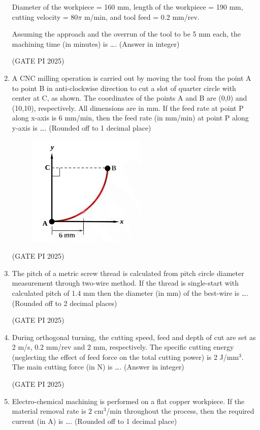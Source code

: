\documentclass[journal,12pt,onecolumn]{IEEEtran}
\theoremstyle{remark}
\begin{document}
\begin{enumerate}
Diameter of the workpiece = 160 mm, length of the workpiece = 190 mm, cutting velocity = $80\pi$ m/min, and tool feed = 0.2 mm/rev.

Assuming the approach and the overrun of the tool to be 5 mm each, the machining time (in minutes) is \dots . (Answer in integer)

\hfill (GATE PI 2025)

\item A CNC milling operation is carried out by moving the tool from the point A to point B in anti-clockwise direction to cut a slot of quarter circle with center at C, as shown. The coordinates of the points A and B are (0,0) and (10,10), respectively. All dimensions are in mm. If the feed rate at point P along x-axis is 6 mm/min, then the feed rate (in mm/min) at point P along y-axis is \dots . (Rounded off to 1 decimal place)

\begin{figure}[H]
\centering
\includegraphics[width=0.5\columnwidth]{fig12.png}
\caption{}
\end{figure}
\hfill (GATE PI 2025)

\item The pitch of a metric screw thread is calculated from pitch circle diameter measurement through two-wire method. If the thread is single-start with calculated pitch of 1.4 mm then the diameter (in mm) of the best-wire is \dots . (Rounded off to 2 decimal places)

\hfill (GATE PI 2025)

\item During orthogonal turning, the cutting speed, feed and depth of cut are set as 2 m/s, 0.2 mm/rev and 2 mm, respectively. The specific cutting energy (neglecting the effect of feed force on the total cutting power) is 2 J/mm$^3$. The main cutting force (in N) is \dots . (Answer in integer)

\hfill (GATE PI 2025)
\item Electro-chemical machining is performed on a flat copper workpiece. If the material removal rate is $2$ cm$^3$/min throughout the process, then the required current (in A) is \dots . (Rounded off to 1 decimal place)


\end{enumerate}
\end{document}
